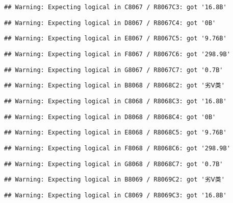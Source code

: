 \documentclass[
]{article}
\begin{document}
\begin{verbatim}
## Warning: Expecting logical in C8067 / R8067C3: got '16.8B'
\end{verbatim}

\begin{verbatim}
## Warning: Expecting logical in D8067 / R8067C4: got '0B'
\end{verbatim}

\begin{verbatim}
## Warning: Expecting logical in E8067 / R8067C5: got '9.76B'
\end{verbatim}

\begin{verbatim}
## Warning: Expecting logical in F8067 / R8067C6: got '298.9B'
\end{verbatim}

\begin{verbatim}
## Warning: Expecting logical in G8067 / R8067C7: got '0.7B'
\end{verbatim}

\begin{verbatim}
## Warning: Expecting logical in B8068 / R8068C2: got '劣Ⅴ类'
\end{verbatim}

\begin{verbatim}
## Warning: Expecting logical in C8068 / R8068C3: got '16.8B'
\end{verbatim}

\begin{verbatim}
## Warning: Expecting logical in D8068 / R8068C4: got '0B'
\end{verbatim}

\begin{verbatim}
## Warning: Expecting logical in E8068 / R8068C5: got '9.76B'
\end{verbatim}

\begin{verbatim}
## Warning: Expecting logical in F8068 / R8068C6: got '298.9B'
\end{verbatim}

\begin{verbatim}
## Warning: Expecting logical in G8068 / R8068C7: got '0.7B'
\end{verbatim}

\begin{verbatim}
## Warning: Expecting logical in B8069 / R8069C2: got '劣Ⅴ类'
\end{verbatim}

\begin{verbatim}
## Warning: Expecting logical in C8069 / R8069C3: got '16.8B'
\end{verbatim}
\end{document}
